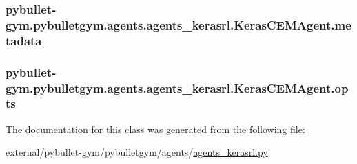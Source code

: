 \subsubsection[{\texorpdfstring{metadata}{metadata}}]{\setlength{\rightskip}{0pt plus 5cm}pybullet-\/gym.\+pybulletgym.\+agents.\+agents\+\_\+kerasrl.\+Keras\+C\+E\+M\+Agent.\+metadata}\hypertarget{classpybullet-gym_1_1pybulletgym_1_1agents_1_1agents__kerasrl_1_1_keras_c_e_m_agent_a0b39d1c66888991d832c6ec9b313edc1}{}\label{classpybullet-gym_1_1pybulletgym_1_1agents_1_1agents__kerasrl_1_1_keras_c_e_m_agent_a0b39d1c66888991d832c6ec9b313edc1}
\subsubsection[{\texorpdfstring{opts}{opts}}]{\setlength{\rightskip}{0pt plus 5cm}pybullet-\/gym.\+pybulletgym.\+agents.\+agents\+\_\+kerasrl.\+Keras\+C\+E\+M\+Agent.\+opts}\hypertarget{classpybullet-gym_1_1pybulletgym_1_1agents_1_1agents__kerasrl_1_1_keras_c_e_m_agent_a11cfd5aaf8419e53d721f63ffd97fdb5}{}\label{classpybullet-gym_1_1pybulletgym_1_1agents_1_1agents__kerasrl_1_1_keras_c_e_m_agent_a11cfd5aaf8419e53d721f63ffd97fdb5}


The documentation for this class was generated from the following file\+:\begin{DoxyCompactItemize}
\item 
external/pybullet-\/gym/pybulletgym/agents/\hyperlink{agents__kerasrl_8py}{agents\+\_\+kerasrl.\+py}\end{DoxyCompactItemize}

